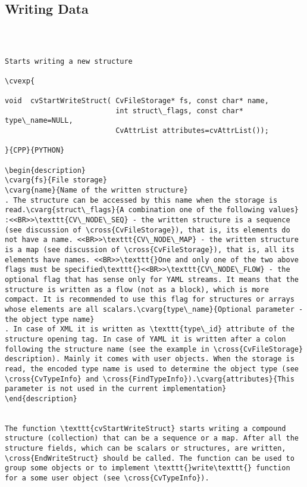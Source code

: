 \subsection{Writing Data}
\begin{verbatim}


\end{verbatim}
\begin{verbatim}

Starts writing a new structure

\cvexp{

void  cvStartWriteStruct( CvFileStorage* fs, const char* name,
                          int struct\_flags, const char* type\_name=NULL,
                          CvAttrList attributes=cvAttrList());

}{CPP}{PYTHON}

\begin{description}
\cvarg{fs}{File storage}
\cvarg{name}{Name of the written structure}
. The structure can be accessed by this name when the storage is read.\cvarg{struct\_flags}{A combination one of the following values}
:<<BR>>\texttt{CV\_NODE\_SEQ} - the written structure is a sequence (see discussion of \cross{CvFileStorage}), that is, its elements do not have a name. <<BR>>\texttt{CV\_NODE\_MAP} - the written structure is a map (see discussion of \cross{CvFileStorage}), that is, all its elements have names. <<BR>>\texttt{}One and only one of the two above flags must be specified\texttt{}<<BR>>\texttt{CV\_NODE\_FLOW} - the optional flag that has sense only for YAML streams. It means that the structure is written as a flow (not as a block), which is more compact. It is recommended to use this flag for structures or arrays whose elements are all scalars.\cvarg{type\_name}{Optional parameter - the object type name}
. In case of XML it is written as \texttt{type\_id} attribute of the structure opening tag. In case of YAML it is written after a colon following the structure name (see the example in \cross{CvFileStorage} description). Mainly it comes with user objects. When the storage is read, the encoded type name is used to determine the object type (see \cross{CvTypeInfo} and \cross{FindTypeInfo}).\cvarg{attributes}{This parameter is not used in the current implementation}
\end{description}


The function \texttt{cvStartWriteStruct} starts writing a compound structure (collection) that can be a sequence or a map. After all the structure fields, which can be scalars or structures, are written, \cross{EndWriteStruct} should be called. The function can be used to group some objects or to implement \texttt{}write\texttt{} function for a some user object (see \cross{CvTypeInfo}).


\end{verbatim}
